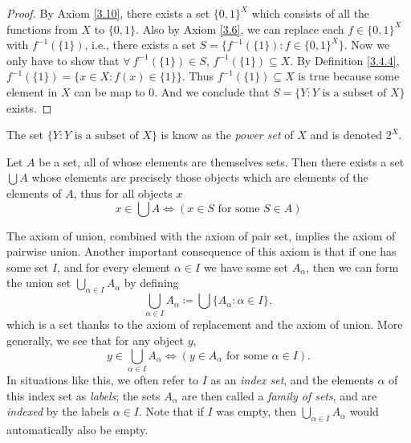 \begin{proof}
By Axiom \ref{3.10}, there exists a set \(\{0, 1\}^X\) which consists of all the functions from \(X\) to \(\{0, 1\}\).
Also by Axiom \ref{3.6}, we can replace each \(f \in \{0, 1\}^X\) with \(f^{-1}(\{1\})\), i.e., there exists a set \(S = \{f^{-1}(\{1\}) : f \in \{0, 1\}^X\}\).
Now we only have to show that \(\forall\ f^{-1}(\{1\}) \in S\), \(f^{-1}(\{1\}) \subseteq X\).
By Definition \ref{3.4.4}, \(f^{-1}(\{1\}) = \{x \in X : f(x) \in \{1\}\}\).
Thus \(f^{-1}(\{1\}) \subseteq X\) is true because some element in \(X\) can be map to \(0\).
And we conclude that \(S = \{Y : Y \text{ is a subset of } X\}\) exists.
\end{proof}

\begin{remark}\label{3.4.10}
The set \(\{Y : Y \text{ is a subset of } X\}\) is know as the \emph{power set} of \(X\) and is denoted \(2^X\).
\end{remark}

\begin{axiom}[Union]\label{3.11}
Let \(A\) be a set, all of whose elements are themselves sets.
Then there exists a set \(\bigcup A\) whose elements are precisely those objects which are elements of the elements of \(A\), thus for all objects \(x\)
\[
    x \in \bigcup A \iff (x \in S \text{ for some } S \in A)
\]
\end{axiom}

\begin{note}
The axiom of union, combined with the axiom of pair set, implies the axiom of pairwise union.
Another important consequence of this axiom is that if one has some set \(I\), and for every element \(\alpha \in I\) we have some set \(A_{\alpha}\), then we can form the union set \(\bigcup_{\alpha \in I} A_{\alpha}\) by defining
\[
    \bigcup_{\alpha \in I} A_{\alpha} \coloneqq \bigcup \{A_{\alpha} : \alpha \in I\},
\]
which is a set thanks to the axiom of replacement and the axiom of union.
More generally, we see that for any object \(y\),
\[
    y \in \bigcup_{\alpha \in I} A_{\alpha} \iff (y \in A_{\alpha} \text{ for some } \alpha \in I).
\]
In situations like this, we often refer to \(I\) as an \emph{index set}, and the elements \(\alpha\) of this index set as \emph{labels};
the sets \(A_{\alpha}\) are then called a \emph{family of sets}, and are \emph{indexed} by the labels \(\alpha \in I\).
Note that if \(I\) was empty, then \(\bigcup_{\alpha \in I} A_{\alpha}\) would automatically also be empty.
\end{note}

